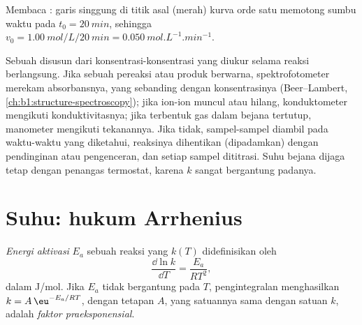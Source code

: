 \begin{omfigure}

{\small Membaca : garis singgung di titik asal (merah) kurva orde
satu memotong sumbu waktu pada $t_0 = \qty{20}{min}$, sehingga $v_0 =
\qty{1.00}{mol/L}/\qty{20}{min} = \qty{0.050}{mol.L^{-1}.min^{-1}}$.}
\end{omfigure}

\begin{inthelab}
Sebuah  disusun dari konsentrasi-konsentrasi yang diukur selama
reaksi berlangsung. Jika sebuah pereaksi atau produk berwarna,
spektrofotometer merekam absorbansnya, yang sebanding dengan
konsentrasinya (Beer--Lambert, \cref{ch:b1:structure-spectroscopy}); jika
ion-ion muncul atau hilang, konduktometer mengikuti konduktivitasnya;
jika terbentuk gas dalam bejana tertutup, manometer mengikuti tekanannya.
Jika tidak, sampel-sampel diambil pada waktu-waktu yang diketahui,
reaksinya dihentikan (dipadamkan) dengan pendinginan atau pengenceran,
dan setiap sampel dititrasi. Suhu bejana dijaga tetap dengan penangas
termostat, karena $k$ sangat bergantung padanya.
\end{inthelab}

\section{Suhu: hukum Arrhenius}

\begin{definition}\label{def:b1:rate-laws:activation-energy}
\emph{Energi aktivasi} $E_a$ sebuah reaksi yang
 $k(T)$ didefinisikan oleh
\[
  \frac{\dd \ln k}{\dd T} = \frac{E_a}{RT^2} ,
\]
dalam \unit{J/mol}. Jika $E_a$ tidak bergantung pada $T$, pengintegralan
menghasilkan $k = A\,\eu^{-E_a/RT}$, dengan tetapan $A$, yang satuannya
sama dengan satuan $k$, adalah \emph{faktor praeksponensial}.
\end{definition}

